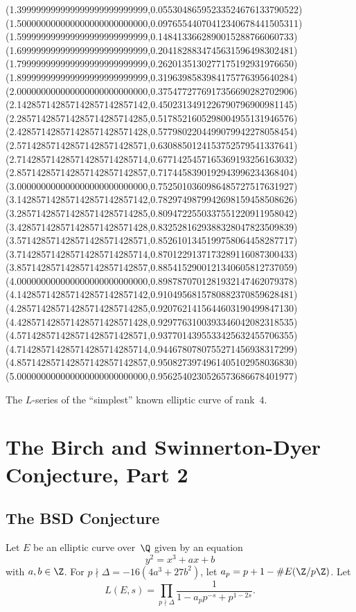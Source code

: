 \documentclass[11pt]{report}
\begin{document}
\begin{center}
  (1.399999999999999999999999999,0.05530486595233524676133790522)
  (1.500000000000000000000000000,0.09765544070412340678441505311)
  (1.599999999999999999999999999,0.1484133662890015288766060733)
  (1.699999999999999999999999999,0.2041828834745631596498302481)
  (1.799999999999999999999999999,0.2620135130277175192931976650)
  (1.899999999999999999999999999,0.3196398583984175776395640284)
  (2.000000000000000000000000000,0.3754772776917356690282702906)
  (2.142857142857142857142857142,0.4502313491226790796900981145)
  (2.285714285714285714285714285,0.5178521605298004955131946576)
  (2.428571428571428571428571428,0.5779802204499079942278058454)
  (2.571428571428571428571428571,0.6308850124153752579541337641)
  (2.714285714285714285714285714,0.6771425457165369193256163032)
  (2.857142857142857142857142857,0.7174458390192943996234368404)
  (3.000000000000000000000000000,0.7525010360986485727517631927)
  (3.142857142857142857142857142,0.7829749879942698159458508626)
  (3.285714285714285714285714285,0.8094722550337551220911958042)
  (3.428571428571428571428571428,0.8325281629388328047823509839)
  (3.571428571428571428571428571,0.8526101345199758064458287717)
  (3.714285714285714285714285714,0.8701229137173289116087300433)
  (3.857142857142857142857142857,0.8854152900121340605812737059)
  (4.000000000000000000000000000,0.8987870701281932147462079378)
  (4.142857142857142857142857142,0.9104956815780882370859628481)
  (4.285714285714285714285714285,0.9207621415644603190499847130)
  (4.428571428571428571428571428,0.9297763100393346042082318535)
  (4.571428571428571428571428571,0.9377014395533425632455706355)
  (4.714285714285714285714285714,0.9446780780755271456938317299)
  (4.857142857142857142857142857,0.9508273974961405102958036830)
  (5.000000000000000000000000000,0.9562540230526573686678401977)
  \endpspicture
  \vspace{1.5em}

  The $L$-series of the ``simplest'' known elliptic curve of rank~$4$.
\end{center}






\chapter{The Birch and Swinnerton-Dyer Conjecture, Part 2}



\section{The BSD Conjecture}
Let $E$ be an elliptic curve over~$\Q$ given by an equation
$$
  y^2 = x^3 + ax + b
$$
with $a,b\in\Z$.  For $p\nmid \Delta = -16(4a^3 + 27b^2)$,
let
$a_p = p+1 - \# E(\Z/p\Z)$.
Let
$$
  L(E,s) = \prod_{p\nmid\Delta} \frac{1}{1-a_p p^{-s} + p^{1-2s}}.
$$
\end{document}
